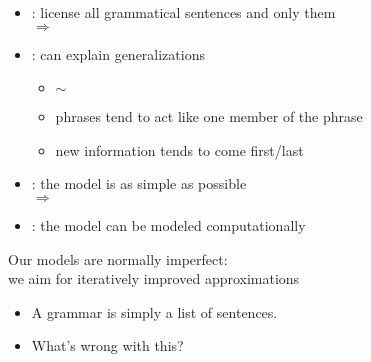 \documentclass[a4paper,landscape,headrule,footrule]{foils}
\begin{document}

\begin{itemize}
\item {}: license all grammatical sentences and only them
\\ $\Rightarrow$ 
\item {}: can explain generalizations
  \begin{itemize}
  \item  {} $\sim$  
  \item phrases tend to act like one member of the phrase 
  \item new information tends to come first/last 
  \end{itemize}
\item {}: the model is as simple as possible 
\\ $\Rightarrow$  
\item {}: the model can be modeled computationally
\end{itemize}

\begin{center}
  Our models are normally imperfect: \\
we aim for iteratively improved approximations
\end{center}

\begin{itemize}
\item A grammar is simply a list of sentences.
\item What’s wrong with this?
\end{itemize}
\end{document}
